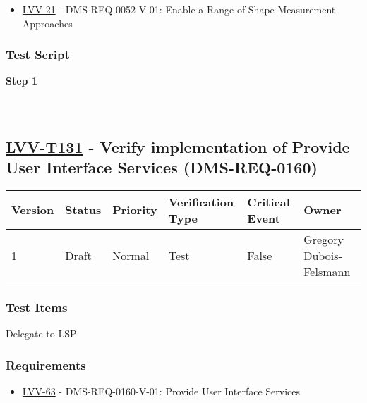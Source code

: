 \begin{itemize}
\tightlist
\item
  \href{https://jira.lsstcorp.org/browse/LVV-21}{LVV-21} -
  DMS-REQ-0052-V-01: Enable a Range of Shape Measurement Approaches
\end{itemize}

\hypertarget{test-script-107}{%
\subsubsection{Test Script}\label{test-script-107}}

\textbf{Step 1}\\
~\\
~\\

\hypertarget{lvv-t131---verify-implementation-of-provide-user-interface-services-dms-req-0160}{%
\subsection{\texorpdfstring{\href{https://jira.lsstcorp.org/secure/Tests.jspa\#/testCase/LVV-T131}{LVV-T131}
- Verify implementation of Provide User Interface Services
(DMS-REQ-0160)}{LVV-T131 - Verify implementation of Provide User Interface Services (DMS-REQ-0160)}}\label{lvv-t131---verify-implementation-of-provide-user-interface-services-dms-req-0160}}

\begin{longtable}[]{@{}llllll@{}}
\toprule
Version & Status & Priority & Verification Type & Critical Event &
Owner\tabularnewline
\midrule
\endhead
1 & Draft & Normal & Test & False & Gregory
Dubois-Felsmann\tabularnewline
\bottomrule
\end{longtable}

\hypertarget{test-items-107}{%
\subsubsection{Test Items}\label{test-items-107}}

Delegate to LSP

\hypertarget{requirements-108}{%
\subsubsection{Requirements}\label{requirements-108}}

\begin{itemize}
\tightlist
\item
  \href{https://jira.lsstcorp.org/browse/LVV-63}{LVV-63} -
  DMS-REQ-0160-V-01: Provide User Interface Services
\end{itemize}

